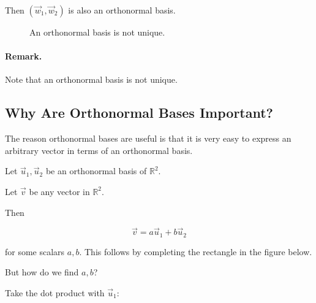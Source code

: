 Then $(\vec w_1,\vec w_2)$ is also an orthonormal basis.

\begin{figure}[h]
\centering
{}
\caption{An orthonormal basis is not unique.}
\end{figure}

\paragraph{Remark.}
Note that an orthonormal basis is not unique.

\subsection{Why Are Orthonormal Bases Important?}

The reason orthonormal bases are useful is that it is very easy to express an
arbitrary vector in terms of an orthonormal basis.

Let $\vec u_1,\vec u_2$ be an orthonormal basis of $\mathbb{R}^2$.

Let $\vec v$ be any vector in $\mathbb{R}^2$.

Then

\[
\vec v=a\vec u_1+b\vec u_2
\]

for some scalars $a,b$. This follows by completing the rectangle in the figure below. 

But how do we find $a,b$?

Take the dot product with $\vec u_1$:

